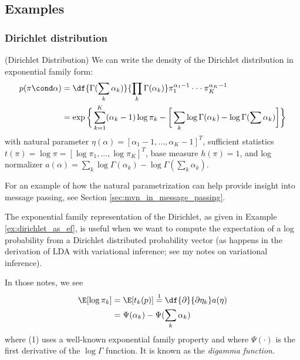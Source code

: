 \documentclass{article} %
\begin{document}
\subsection{Examples}
\subsubsection{Dirichlet distribution}

\begin{example}{(Dirichlet Distribution)} 
\label{ex:dirichlet_as_ef} We can write the density of the Dirichlet distribution in exponential family form:
\begin{align*}
p (\pi \cond\alpha) &= \df{\Gamma(\sum_k \alpha_k)}{\prod_k \Gamma (\alpha_k) } \pi_1^{\alpha_1 -1} \cdot \cdot \cdot \pi_K^{\alpha_K -1} \\
&= \exp \bigg\{ \sum_{k=1}^K (\alpha_k -1) \log \pi_k - \bigg[ \sum_k \log \Gamma (\alpha_k)-  \log \Gamma (\sum \alpha_k) \bigg]  \bigg\}
\end{align*}
with natural parameter $\eta(\alpha) = [\alpha_1 -1, ..., \alpha_K -1]^T$, sufficient statistics $t(\pi) = \log \pi = [\log \pi_1, ..., \log \pi_K]^T$, base measure $h(\pi)=1$, and log normalizer $a(\alpha) =  \sum_k \log \Gamma (\alpha_k ) - \log \Gamma (\sum_k \alpha_k)$. 
  
\end{example} 

For an example of how the natural parametrization can help provide insight into message passing,  see Section \ref{sec:mvn_in_message_passing}.

\begin{remark} The exponential family representation of the Dirichlet, as given in Example \ref{ex:dirichlet_as_ef}, is useful when we want to compute the expectation of a log probability from a Dirichlet distributed probability vector (as happens in the derivation of LDA with variational inference; see my notes on variational inference).  

In those notes,  we see
\begin{align} 
\E [ \log \pi_k] &= \E [t_k(p)] \stackrel{1}{=} \df{\partial}{\partial \eta_k} a(\eta) \nonumber \\
&=\Psi(\alpha_k) -  \Psi(\sum_k  \alpha_k) \label{eqn:expectation_of_log_probability} 
\end{align}
where (1) uses a well-known exponential family property and where $\Psi(\cdot)$ is the first derivative of the $\log \Gamma$ function.   It is known as the \textit{digamma function}.  $ $

\end{remark}
\end{document}
